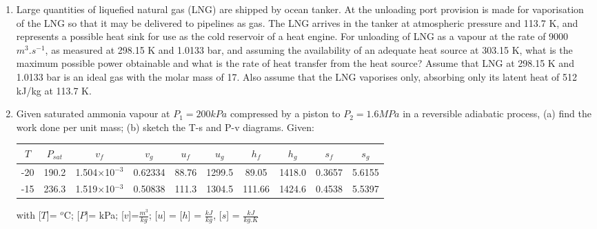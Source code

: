 \documentclass[12pts,a4paper,amsmath,amssymb,floatfix]{article}%
\begin{document}
\begin{enumerate}[label=\bfseries Problem \arabic*:]
\item\label{Tut02:LNG} Large quantities of liquefied natural gas (LNG) are shipped by ocean tanker. At the unloading port provision is made for vaporisation of the LNG so that it may be delivered to pipelines as gas. The LNG arrives in the tanker at atmospheric pressure and 113.7 K, and represents a possible heat sink for use as the cold reservoir of a heat engine. For unloading of LNG as a vapour at the rate of 9000 $m^{3}.s^{-1}$, as measured at 298.15 K and 1.0133 bar, and assuming the availability of an adequate heat source at 303.15 K, what is the maximum possible power obtainable and what is the rate of heat transfer from the heat source? Assume that LNG at 298.15 K and 1.0133 bar is an ideal gas with the molar mass of 17. Also assume that the LNG vaporises only, absorbing only its latent heat of 512 kJ/kg at 113.7 K.


\item Given saturated ammonia vapour at $P_{1} = 200 kPa$ compressed by a piston to $P_{2} = 1.6 MPa$ in a reversible adiabatic process, (a) find the work done per unit mass; (b) sketch the T-s and P-v diagrams. Given:
\begin{center}
\begin{tabular}{||c|c|c c|c c|c c|c c||} 
\hline\hline
$T$ & $P_{sat}$ & $v_{f}$ &  $v_{g}$ & $u_{f}$ & $u_{g}$ &  $h_{f}$ &  $h_{g}$ & $s_{f}$ & $s_{g}$ \\ 
\hline
-20 & 190.2 & 1.504$\times$10$^{-3}$ & 0.62334 & 88.76 & 1299.5 & 89.05 & 1418.0 & 0.3657 & 5.6155 \\
\hline
-15 & 236.3 & 1.519$\times$10$^{-3}$ & 0.50838 & 111.3 & 1304.5 & 111.66 & 1424.6 & 0.4538 & 5.5397 \\ 
\hline\hline
\end{tabular}
\end{center}

with
[$T$]= $^{o}$C; [$P$]= kPa; [$v$]=$\frac{m^{3}}{kg}$; [$u$] = [$h$] = $\frac{kJ}{kg}$, [$s$] = $\frac{kJ}{kg.K}$ 



\end{enumerate}



\clearpage

%
\end{document}
